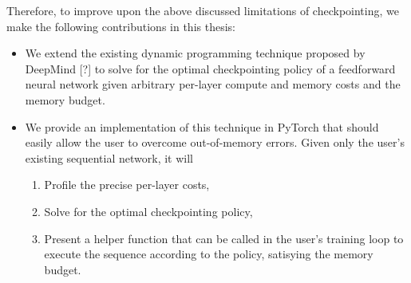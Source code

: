 Therefore, to improve upon the above discussed limitations of checkpointing, we make the following contributions in this thesis:
\begin{itemize}
    \item We extend the existing dynamic programming technique proposed by DeepMind [?] to solve for the optimal checkpointing policy of a feedforward neural network given arbitrary per-layer compute and memory costs and the memory budget.
    \item We provide an implementation of this technique in PyTorch that should easily allow the user to overcome out-of-memory errors. Given only the user's existing sequential network, it will
    \begin{enumerate}
        \item Profile the precise per-layer costs,
        \item Solve for the optimal checkpointing policy,
        \item Present a helper function that can be called in the user's training loop to execute the sequence according to the policy, satisying the memory budget.
    \end{enumerate}
\end{itemize}
